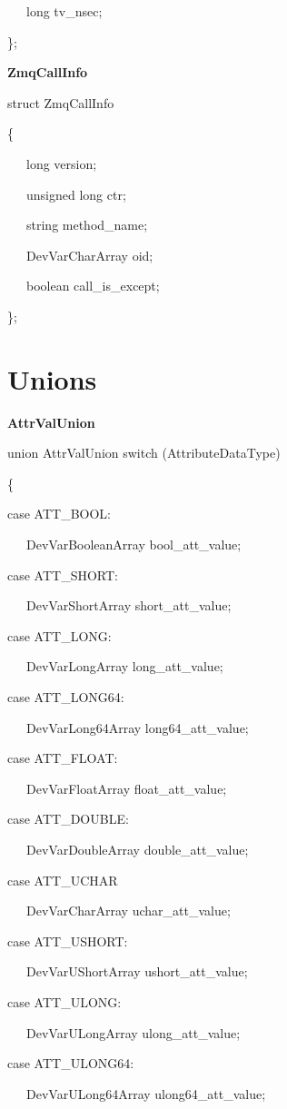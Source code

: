 ~~~long tv\_nsec;

\};\\

\begin{flushleft}
\textbf{ZmqCallInfo}
\par\end{flushleft}

struct ZmqCallInfo

\{

~~~long version;

~~~unsigned long ctr;

~~~string method\_name;

~~~DevVarCharArray oid;

~~~boolean call\_is\_except;

\};

\section{Unions}

\textbf{AttrValUnion}

union AttrValUnion switch (AttributeDataType)

\{

case ATT\_BOOL:

~~~DevVarBooleanArray bool\_att\_value;

case ATT\_SHORT:

~~~DevVarShortArray short\_att\_value;

case ATT\_LONG:

~~~DevVarLongArray long\_att\_value;

case ATT\_LONG64:

~~~DevVarLong64Array long64\_att\_value;

case ATT\_FLOAT:

~~~DevVarFloatArray float\_att\_value;

case ATT\_DOUBLE:

~~~DevVarDoubleArray double\_att\_value;

case ATT\_UCHAR

~~~DevVarCharArray uchar\_att\_value;

case ATT\_USHORT:

~~~DevVarUShortArray ushort\_att\_value;

case ATT\_ULONG:

~~~DevVarULongArray ulong\_att\_value;

case ATT\_ULONG64:

~~~DevVarULong64Array ulong64\_att\_value;

